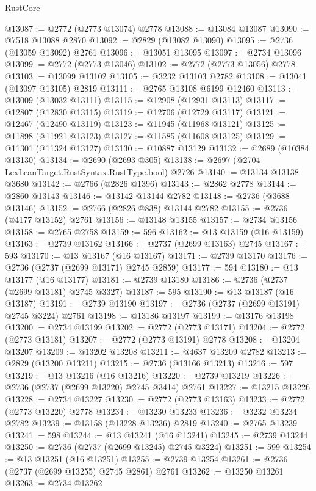\begin{lexlean}{RustCore}
\begin{coremodule}
@13087 := @2772 (@2773 @13074) @2778
@13088 := @13084 @13087
@13090 := @7518 @13088 @2870
@13092 := @2829 (@13082 @13090)
@13095 := @2736 (@13059 @13092) @2761
@13096 := @13051 @13095
@13097 := @2734 @13096
@13099 := @2772 (@2773 @13046)
@13102 := @2772 (@2773 @13056) @2778
@13103 := @13099 @13102
@13105 := @3232 @13103 @2782
@13108 := @13041 (@13097 @13105) @2819
@13111 := @2765 @13108 @6199 @12460
@13113 := @13009 (@13032 @13111)
@13115 := @12908 (@12931 @13113)
@13117 := @12807 (@12830 @13115)
@13119 := @12706 (@12729 @13117)
@13121 := @12467 (@12490 @13119)
@13123 := @11945 (@11968 @13121)
@13125 := @11898 (@11921 @13123)
@13127 := @11585 (@11608 @13125)
@13129 := @11301 (@11324 @13127)
@13130 := @10887 @13129
@13132 := @2689 (@10384 @13130)
@13134 := @2690 (@2693 @305)
@13138 := @2697 (@2704 LexLeanTarget.RustSyntax.RustType.bool) @2726
@13140 := @13134 @13138 @3680
@13142 := @2766 (@2826 @1396)
@13143 := @2862 @2778
@13144 := @2860 @13143
@13146 := @13142 @13144 @2782
@13148 := @2736 (@3688 @13146)
@13152 := @2766 (@2826 @838) @13144 @2782
@13155 := @2736 (@4177 @13152) @2761
@13156 := @13148 @13155
@13157 := @2734 @13156
@13158 := @2765 @2758
@13159 := 596
@13162 := @13 @13159 (@16 @13159)
@13163 := @2739 @13162
@13166 := @2737 (@2699 @13163) @2745
@13167 := 593
@13170 := @13 @13167 (@16 @13167)
@13171 := @2739 @13170
@13176 := @2736 (@2737 (@2699 @13171) @2745 @2859)
@13177 := 594
@13180 := @13 @13177 (@16 @13177)
@13181 := @2739 @13180
@13186 := @2736 (@2737 (@2699 @13181) @2745 @3327)
@13187 := 595
@13190 := @13 @13187 (@16 @13187)
@13191 := @2739 @13190
@13197 := @2736 (@2737 (@2699 @13191) @2745 @3224) @2761
@13198 := @13186 @13197
@13199 := @13176 @13198
@13200 := @2734 @13199
@13202 := @2772 (@2773 @13171)
@13204 := @2772 (@2773 @13181)
@13207 := @2772 (@2773 @13191) @2778
@13208 := @13204 @13207
@13209 := @13202 @13208
@13211 := @4637 @13209 @2782
@13213 := @2829 (@13200 @13211)
@13215 := @2736 (@13166 @13213)
@13216 := 597
@13219 := @13 @13216 (@16 @13216)
@13220 := @2739 @13219
@13226 := @2736 (@2737 (@2699 @13220) @2745 @3414) @2761
@13227 := @13215 @13226
@13228 := @2734 @13227
@13230 := @2772 (@2773 @13163)
@13233 := @2772 (@2773 @13220) @2778
@13234 := @13230 @13233
@13236 := @3232 @13234 @2782
@13239 := @13158 (@13228 @13236) @2819
@13240 := @2765 @13239
@13241 := 598
@13244 := @13 @13241 (@16 @13241)
@13245 := @2739 @13244
@13250 := @2736 (@2737 (@2699 @13245) @2745 @3224)
@13251 := 599
@13254 := @13 @13251 (@16 @13251)
@13255 := @2739 @13254
@13261 := @2736 (@2737 (@2699 @13255) @2745 @2861) @2761
@13262 := @13250 @13261
@13263 := @2734 @13262

\end{coremodule}
\end{lexlean}
